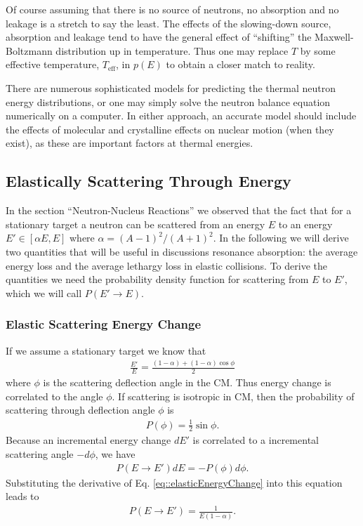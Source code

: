 \documentclass[11pt]{article}
\begin{document}
Of course assuming that there is no source of neutrons, no absorption and no leakage is a stretch to say the least.  The effects of the slowing-down source, absorption and leakage tend to have the general effect of ``shifting'' the Maxwell-Boltzmann distribution up in temperature.  Thus one may replace \(T\) by some effective temperature, \(T_{\text{eff}}\), in \(p(E)\) to obtain a closer match to reality.

There are numerous sophisticated models for predicting the thermal neutron energy distributions, or one may simply solve the neutron balance equation numerically on a computer.  In either approach, an accurate model should include the effects of molecular and crystalline effects on nuclear motion (when they exist), as these are important factors at thermal energies.
\subsection{Elastically Scattering Through Energy}
\label{sec:orgheadline36}
In the section ``Neutron-Nucleus Reactions'' we observed that the fact that for a stationary target a neutron can be scattered from an energy \(E\) to an energy \(E' \in [\alpha E, E]\) where \(\alpha = (A-1)^2/(A+1)^2\).  In the following we will derive two quantities that will be useful in discussions resonance absorption: the average energy loss and the average lethargy loss in elastic collisions.  To derive the quantities we need the probability density function for scattering from \(E\) to \(E'\), which we will call \(P(E' \rightarrow E)\).

\subsubsection{Elastic Scattering Energy Change}
\label{sec:orgheadline33}
If we assume a stationary target we know that
\begin{align}
  \label{eq::elasticEnergyChange}
  \frac{E'}{E} = \frac{(1-\alpha) + (1-\alpha) \cos\phi}{2}
\end{align}
where \(\phi\) is the scattering deflection angle in the CM.  Thus energy change is correlated to the angle \(\phi\).  If scattering is isotropic in CM, then the probability of scattering through deflection angle \(\phi\) is
\begin{align}
  P(\phi) = \frac{1}{2}\sin\phi.
\end{align}
Because an incremental energy change \(dE'\) is correlated to a incremental scattering angle \(-d\phi\), we have
\begin{align}
  P(E \rightarrow E') dE = -P(\phi) d\phi.
\end{align}
Substituting the derivative of Eq. \eqref{eq::elasticEnergyChange} into this equation leads to
\begin{align}
  P(E \rightarrow E') = \frac{1}{E(1-\alpha)}.
\end{align}
\end{document}
